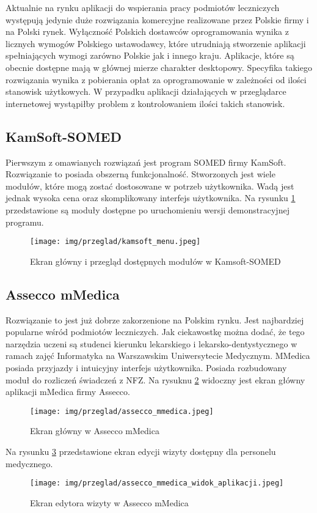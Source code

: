 Aktualnie na rynku aplikacji do wspierania pracy podmiotów leczniczych występują jedynie duże rozwiązania komercyjne realizowane przez Polskie firmy i na Polski rynek. Wyłączność Polskich dostawców oprogramowania wynika z licznych wymogów Polskiego ustawodawcy, które utrudniają stworzenie aplikacji spełniających wymogi zarówno Polskie jak i innego kraju. Aplikacje, które są obecnie dostępne mają w głównej mierze charakter desktopowy. Specyfika takiego rozwiązania wynika z pobierania opłat za oprogramowanie w zależności od ilości stanowisk użytkowych. W przypadku aplikacji działających w przeglądarce internetowej wystąpiłby problem z kontrolowaniem ilości takich stanowisk.  
\subsection{KamSoft-SOMED}
Pierwszym z omawianych rozwiązań jest program SOMED firmy KamSoft. Rozwiązanie to posiada obszerną funkcjonalność. Stworzonych jest wiele modułów, które mogą zostać dostosowane w potrzeb użytkownika. Wadą jest jednak wysoka cena oraz skomplikowany interfejs użytkownika. Na rysunku \ref{kamsoft_menu} przedstawione są moduły dostępne po uruchomieniu wersji demonstracyjnej programu.

\begin{figure}[htb]
    \begin{center}
	\texttt{[image: img/przeglad/kamsoft\_menu.jpeg]}
	\caption{Ekran główny i przegląd dostępnych modułów w Kamsoft-SOMED}
	\label{kamsoft_menu}
    \end{center}
\end{figure}

\subsection{Assecco mMedica}
Rozwiązanie to jest już dobrze zakorzenione na Polskim rynku. Jest najbardziej popularne wśród podmiotów leczniczych. Jak ciekawostkę można dodać, że tego narzędzia uczeni są studenci kierunku lekarskiego i lekarsko-dentystycznego w ramach zajęć Informatyka na Warszawskim Uniwersytecie Medycznym. MMedica posiada przyjazdy i intuicyjny interfejs użytkownika. Posiada rozbudowany moduł do rozliczeń świadczeń z NFZ. 
Na rysuknu \ref{assecco_mmedica} widoczny jest ekran główny aplikacji mMedica firmy Assecco. 
\begin{figure}[htb]
    \begin{center}
	\texttt{[image: img/przeglad/assecco\_mmedica.jpeg]}
	\caption{Ekran główny w Assecco mMedica}
	\label{assecco_mmedica}
    \end{center}
\end{figure}
Na rysunku \ref{assecco_mmedica_widok_aplikacji} przedstawione ekran edycji wizyty dostępny dla personelu medycznego.
\begin{figure}[htb]
    \begin{center}
	\texttt{[image: img/przeglad/assecco\_mmedica\_widok\_aplikacji.jpeg]}
	\caption{Ekran edytora wizyty w Assecco mMedica}
	\label{assecco_mmedica_widok_aplikacji}
    \end{center}
\end{figure}

